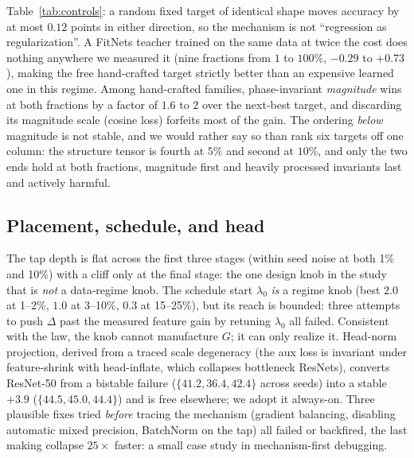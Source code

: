  Table~\ref{tab:controls}: a random fixed target of identical shape moves
accuracy by at most $0.12$ points in either direction, so the mechanism is not
``regression as regularization''. A FitNets teacher trained on the same data at twice the
cost does nothing anywhere we measured it (nine fractions from $1$ to
$100\%$, $-0.29$ to $+0.73$), making the free hand-crafted target strictly better than an
expensive learned one in this regime. Among hand-crafted families, phase-invariant \emph{magnitude} wins at both
fractions by a factor of $1.6$ to $2$ over the next-best target, and
discarding its magnitude scale (cosine loss) forfeits most of the gain. The
ordering \emph{below} magnitude is not stable, and we would rather say so than
rank six targets off one column: the structure tensor is fourth at $5\%$ and
second at $10\%$, and only the two ends hold at both fractions, magnitude
first and heavily processed invariants last and actively harmful.

\subsection{Placement, schedule, and head}\label{abl:placement}
The tap depth is flat across the first three stages (within seed noise at
both 1\% and 10\%) with a cliff only at the final stage: the one design
knob in the study that is \emph{not} a data-regime knob. The schedule
start $\lambda_0$ \emph{is} a regime knob (best $2.0$ at 1--2\%, $1.0$ at
3--10\%, $0.3$ at 15--25\%), but its reach is bounded: three attempts to
push $\Delta$ past the measured feature gain by retuning $\lambda_0$ all
failed. Consistent with the law, the knob cannot manufacture $G$; it can only
realize it. Head-norm projection, derived from a traced scale
degeneracy (the aux loss is invariant under feature-shrink with head-inflate,
which collapses bottleneck ResNets), converts ResNet-50 from a bistable
failure ($\{41.2, 36.4, 42.4\}$ across seeds) into a stable $+3.9$
($\{44.5, 45.0, 44.4\}$) and is free elsewhere; we adopt it always-on.
Three plausible fixes tried \emph{before} tracing the mechanism (gradient
balancing, disabling automatic mixed precision, BatchNorm on the tap) all
failed or backfired, the last making collapse $25\times$ faster: a small case
study in mechanism-first debugging.

